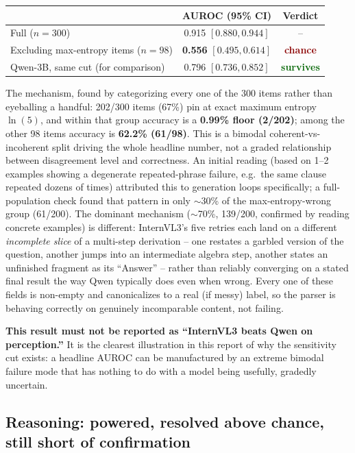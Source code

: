 \documentclass[11pt]{article}
\newcommand{\worked}[1]{\textcolor{darkgreen}{\textbf{#1}}}
\newcommand{\failed}[1]{\textcolor{darkred}{\textbf{#1}}}
\begin{document}
\begin{center}
\begin{tabular}{lcc}
\toprule
& AUROC (95\% CI) & Verdict \\
\midrule
Full ($n=300$) & 0.915 $[0.880, 0.944]$ & -- \\
Excluding max-entropy items ($n=98$) & \textbf{0.556} $[0.495, 0.614]$ & \failed{chance} \\
Qwen-3B, same cut (for comparison) & 0.796 $[0.736, 0.852]$ & \worked{survives} \\
\bottomrule
\end{tabular}
\end{center}

The mechanism, found by categorizing every one of the 300 items rather
than eyeballing a handful: 202/300 items (67\%) pin at exact maximum
entropy $\ln(5)$, and within that group accuracy is a \textbf{0.99\% floor
(2/202)}; among the other 98 items accuracy is \textbf{62.2\% (61/98)}.
This is a bimodal coherent-vs-incoherent split driving the whole headline
number, not a graded relationship between disagreement level and
correctness. An initial reading (based on 1--2 examples showing a
degenerate repeated-phrase failure, e.g.\ the same clause repeated dozens
of times) attributed this to generation loops specifically; a
full-population check found that pattern in only $\sim$30\% of the
max-entropy-wrong group (61/200). The dominant mechanism ($\sim$70\%,
139/200, confirmed by reading concrete examples) is different: InternVL3's
five retries each land on a different \emph{incomplete slice} of a
multi-step derivation -- one restates a garbled version of the question,
another jumps into an intermediate algebra step, another states an
unfinished fragment as its ``Answer'' -- rather than reliably converging
on a stated final result the way Qwen typically does even when wrong.
Every one of these fields is non-empty and canonicalizes to a real (if
messy) label, so the parser is behaving correctly on genuinely
incomparable content, not failing.

\textbf{This result must not be reported as ``InternVL3 beats Qwen on
perception.''} It is the clearest illustration in this report of why the
sensitivity cut exists: a headline AUROC can be manufactured by an
extreme bimodal failure mode that has nothing to do with a model being
usefully, gradedly uncertain.

\subsection{Reasoning: powered, resolved above chance, still short of
confirmation}
\label{sec:phase6-reasoning}
\end{document}
